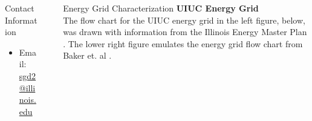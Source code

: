 \documentclass[final]{beamer}
\newlength{\sepwid}
\newlength{\onecolwid}
\newlength{\threecolwid}
\begin{document}
\begin{frame}[t]
\begin{columns}[t,totalwidth=\threecolwid]
\begin{column}{\onecolwid}
\begin{alertblock}{Contact Information}
	\begin{itemize}
		\item Email: \href{mailto:sgd2@illinois.edu}{sgd2@illinois.edu}
	\end{itemize}
	
\end{alertblock}


\end{column} %

\begin{column}{\sepwid}\end{column} %



\begin{column}{\onecolwid} %

\begin{block}{Energy Grid Characterization}
\vspace{0.7em}
\textbf{UIUC Energy Grid}\\

The flow chart for the UIUC energy grid in the left figure, below, was drawn with information from the 
Illinois Energy Master Plan \cite{affiliated_engineers_inc_utilities_2015}. The lower right figure emulates
the energy grid flow chart from Baker et. al \cite{baker_optimal_2018}.  




\end{block}
\end{column}
\end{columns}
\end{frame}
\end{document}
